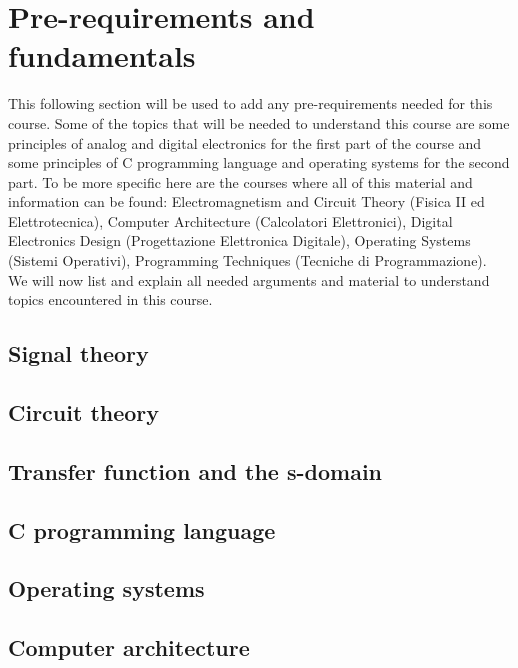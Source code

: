\documentclass[../main.tex]{subfiles}
\begin{document}
\clearpage
\thispagestyle{empty}
\vspace*{7cm}
\section{Pre-requirements and fundamentals}
\vspace*{1.5cm}

This following section will be used to add any pre-requirements needed for this course. Some of the topics that will be needed to understand this course are some principles of analog and digital electronics for the first part of the course and some principles of C programming language and operating systems for the second part.
To be more specific here are the courses where all of this material and information can be found: Electromagnetism and Circuit Theory (Fisica II ed Elettrotecnica), Computer Architecture (Calcolatori Elettronici), Digital Electronics Design (Progettazione Elettronica Digitale), Operating Systems (Sistemi Operativi), Programming Techniques (Tecniche di Programmazione).\\

We will now list and explain all needed arguments and material to understand topics encountered in this course.

\subsection{Signal theory}

\subsection{Circuit theory}

\subsection{Transfer function and the s-domain}

\subsection{C programming language}

\subsection{Operating systems}

\subsection{Computer architecture}
\end{document}
